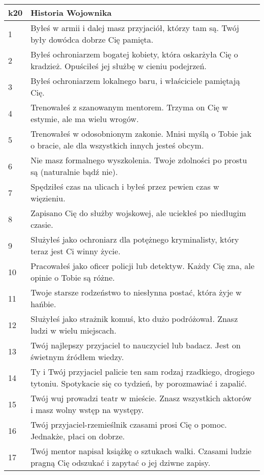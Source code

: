 \begin{table*}[t]
 \centering
 \begin{tabularx}{\textwidth}{| p{} | X |}
  \hline
  \textbf{k20} & \textbf{Historia Wojownika}  \\ \hline
    1 & Byłeś w armii i dalej masz przyjaciół, którzy tam są. Twój były dowódca dobrze Cię pamięta. \\ \hline
    2 & Byłeś ochroniarzem bogatej kobiety, która oskarżyła Cię o kradzież. Opuściłeś jej służbę w cieniu podejrzeń. \\ \hline
    3 & Byłeś ochroniarzem lokalnego baru, i właściciele pamiętają Cię.  \\ \hline
    4 & Trenowałeś z szanowanym mentorem. Trzyma on Cię w estymie, ale ma wielu wrogów. \\ \hline
    5 & Trenowałeś w odosobnionym zakonie. Mnisi myślą o Tobie jak o bracie, ale dla wszystkich innych jesteś obcym. \\ \hline
    6 & Nie masz formalnego wyszkolenia. Twoje zdolności po prostu są (naturalnie bądź nie). \\ \hline
    7 & Spędziłeś czas na ulicach i byłeś przez pewien czas w więzieniu. \\ \hline
    8 & Zapisano Cię do służby wojskowej, ale uciekłeś po niedługim czasie. \\ \hline
    9 & Służyłeś jako ochroniarz dla potężnego kryminalisty, który teraz jest Ci winny życie. \\ \hline
    10 & Pracowałeś jako oficer policji lub detektyw. Każdy Cię zna, ale opinie o Tobie są różne. \\ \hline
    11 & Twoje starsze rodzeństwo to niesłynna postać, która żyje w hańbie.  \\ \hline
    12 & Służyłeś jako strażnik komuś, kto dużo podróżował. Znasz ludzi w wielu miejscach. \\ \hline
    13 & Twój najlepszy przyjaciel to nauczyciel lub badacz. Jest on świetnym źródłem wiedzy. \\ \hline
    14 & Ty i Twój przyjaciel palicie ten sam rodzaj rzadkiego, drogiego tytoniu. Spotykacie się co tydzień, by porozmawiać i zapalić. \\ \hline
    15 & Twój wuj prowadzi teatr w mieście. Znasz wszystkich aktorów i masz wolny wstęp na występy. \\ \hline
    16 & Twój przyjaciel-rzemieślnik czasami prosi Cię o pomoc. Jednakże, płaci on dobrze. \\ \hline
    17 & Twój mentor napisał książkę o sztukach walki. Czasami ludzie pragną Cię odszukać i zapytać o jej dziwne zapisy. \\ \hline

\end{tabularx}
\end{table*}
